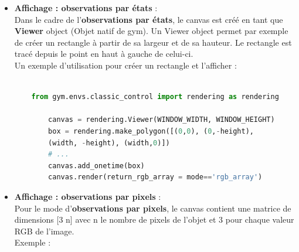 \documentclass[11pt, a4paper]{article}
\begin{document}
\begin{itemize}

	\item \textbf{Affichage : observations par états} : \\
	
	\noindent Dans le cadre de l'\textbf{observations par états}, le canvas est créé en tant que \textbf{Viewer} object \cite{rendering.py} (Objet natif de gym). 
	Un Viewer object permet par exemple de créer un rectangle à partir de sa largeur et de sa hauteur. Le rectangle est tracé 
	depuis le point en haut à gauche de celui-ci.\\
	Un exemple d'utilisation pour créer un rectangle et l'afficher :\\
	
	\begin{lstlisting}[language=python, frame=single, gobble=4, tabsize=4]
		
	from gym.envs.classic_control import rendering as rendering

		canvas = rendering.Viewer(WINDOW_WIDTH, WINDOW_HEIGHT)
		box = rendering.make_polygon([(0,0), (0,-height), 
		(width, -height), (width,0)])
		# ...
		canvas.add_onetime(box)
		canvas.render(return_rgb_array = mode=='rgb_array')
	\end{lstlisting}



	\item \textbf{Affichage : observations par pixels} : \\
	
	\noindent Pour le mode d'\textbf{observations par pixels}, le canvas contient une matrice de dimensions [3 n] avec n le nombre de pixels de l’objet et 3 pour chaque valeur RGB de l’image. \\ Exemple : \\


\end{itemize}
\end{document}

